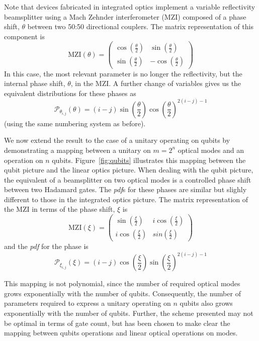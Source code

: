 \documentclass[aps,prl,twocolumn,floatfix]{revtex4}
\newcommand{\mat}[1]{\mathrm{#1}}
\newcommand{\of}[1]{\!\left(#1\right)}
\newcommand{\pdf}{{\it pdf}}
\newcommand{\prob}[1]{\mathcal{#1}}
\begin{document}
Note that devices fabricated in integrated optics implement a variable
reflectivity beamsplitter using a Mach Zehnder interferometer (MZI) composed of
a phase shift, \( \theta \) between two 50:50 directional couplers. The matrix
representation of this component is
\begin{equation}
  \mat{MZI} \of{ \theta } = \begin{pmatrix}
    \cos \of{ \frac{\theta}{2} } & \sin \of{ \frac{\theta}{2} } \\
    \sin \of{ \frac{\theta}{2} } & -\cos \of{ \frac{\theta}{2} }
  \end{pmatrix}
\end{equation}
In this case, the most relevant parameter is no longer the reflectivity, but the
internal phase shift, \(\theta\), in the MZI. A further change of variables
gives us the equivalent distributions for these phases as
\begin{equation}
  \prob{P}_{\theta_{i,j}}\of{\theta} = \left( i-j \right) \sin
  \of{\frac{\theta}{2}} \cos \of{\frac{\theta}{2}}^{2 \left(i-j\right)-1} 
\end{equation}
(using the same numbering system as before).

We now extend the result to the case of a unitary operating on qubits by
demonstrating a mapping between a unitary on \(m=2^{n}\) optical modes and an
operation on \(n\) qubits.
Figure~\ref{fig:qubits} illustrates this mapping between the qubit picture and
the linear optics picture. When dealing with the qubit picture, the equivalent
of a beamsplitter on two optical modes is a controlled phase shift between two
Hadamard gates. The \pdf{}s for these phases are similar but slighly different
to those in the integrated optics picture. The matrix representation of the MZI
in terms of the phase shift, \(\xi\) is
\begin{equation}
  \mat{MZI} \of{ \xi } = \begin{pmatrix}
    \sin \of{ \frac{\xi}{2} } & i \cos \of{ \frac{\xi}{2} } \\
    i \cos \of{ \frac{\xi}{2} } & sin \of{ \frac{\xi}{2} }
  \end{pmatrix}
\end{equation}
and the \pdf{} for the phase is
\begin{equation}
  \prob{P}_{ \xi_{i,j} } \of{ \xi } = \left( i-j \right) \cos \of{ \frac{ \xi
  }{2} } \sin \of{ \frac{ \xi }{2} }^{ 2 \left( i-j \right)-1}
\end{equation}

This mapping is not polynomial, since the number of required optical
modes grows exponentially with the number of qubits. Consequently, the number of
parameters required to express a unitary operating on \(n\) qubits also grows
exponentially with the number of qubits. Further, the scheme presented may not
be optimal in terms of gate count, but has been chosen to make clear the mapping
between qubits operations and linear optical operations on modes.
\end{document}
